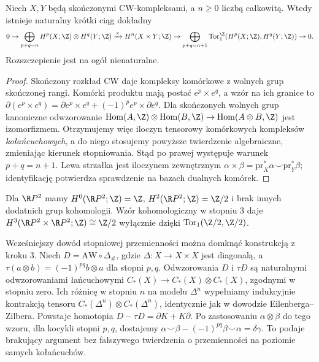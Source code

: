 \begin{twierdzenie}
Niech $X,Y$ będą skończonymi CW-kompleksami,
a $n\geq0$ liczbą całkowitą. Wtedy
istnieje naturalny krótki ciąg dokładny
\[
0\to\bigoplus_{p+q=n}H^p(X;\Z)\otimes H^q(Y;\Z)
\xrightarrow{\times}H^n(X\times Y;\Z)
\to\bigoplus_{p+q=n+1}\operatorname{Tor}^{\Z}_1
(H^p(X;\Z),H^q(Y;\Z))\to0.
\]
Rozszczepienie jest na ogół nienaturalne.
\end{twierdzenie}
\begin{proof}
Skończony rozkład CW daje kompleksy komórkowe z wolnych
grup skończonej rangi. Komórki produktu mają postać
$e^p\times e^q$, a wzór na ich granice to
$\partial(e^p\times e^q)=\partial e^p\times e^q
+(-1)^p e^p\times\partial e^q$.
Dla skończonych wolnych grup kanoniczne odwzorowanie
$\operatorname{Hom}(A,\Z)\otimes\operatorname{Hom}(B,\Z)
\to\operatorname{Hom}(A\otimes B,\Z)$ jest izomorfizmem.
Otrzymujemy więc iloczyn tensorowy komórkowych kompleksów
\emph{kołańcuchowych}, a do niego stosujemy powyższe
twierdzenie algebraiczne, zmieniając kierunek stopniowania.
Stąd po prawej występuje warunek $p+q=n+1$.
Lewa strzałka jest iloczynem zewnętrznym
$\alpha\times\beta=\mathrm{pr}_X^*\alpha\smile\mathrm{pr}_Y^*\beta$;
identyfikację potwierdza sprawdzenie na bazach dualnych komórek.
\end{proof}

\begin{przyklad}
Dla $\R P^2$ mamy $H^0(\R P^2;\Z)=\Z$,
$H^2(\R P^2;\Z)=\Z/2$ i brak innych dodatnich grup
kohomologii. Wzór kohomologiczny w stopniu $3$ daje
$H^3(\R P^2\times\R P^2;\Z)\cong\Z/2$ wyłącznie dzięki
$\operatorname{Tor}_1(\Z/2,\Z/2)$.
\end{przyklad}

\begin{uwaga}
Wcześniejszy dowód stopniowej przemienności można domknąć
konstrukcją z kroku 3. Niech $D=\mathrm{AW}\circ\Delta_\#$,
gdzie $\Delta:X\to X\times X$ jest diagonalą, a
$\tau(a\otimes b)=(-1)^{pq}b\otimes a$ dla stopni $p,q$.
Odwzorowania $D$ i $\tau D$ są naturalnymi odwzorowaniami łańcuchowymi
$C_*(X)\to C_*(X)\otimes C_*(X)$, zgodnymi w stopniu zero.
Ich różnicę w stopniu $n$ na modelu $\Delta^n$ wypełniamy
indukcyjnie kontrakcją tensoru
$C_*(\Delta^n)\otimes C_*(\Delta^n)$, identycznie jak w
dowodzie Eilenberga--Zilbera. Powstaje homotopia
$D-\tau D=\partial K+K\partial$. Po zastosowaniu
$\alpha\otimes\beta$ do tego wzoru, dla kocykli stopni
$p,q$, dostajemy
$\alpha\smile\beta-(-1)^{pq}\beta\smile\alpha=\delta\gamma$.
To podaje brakujący argument bez fałszywego twierdzenia o
przemienności na poziomie samych kołańcuchów.
\end{uwaga}


